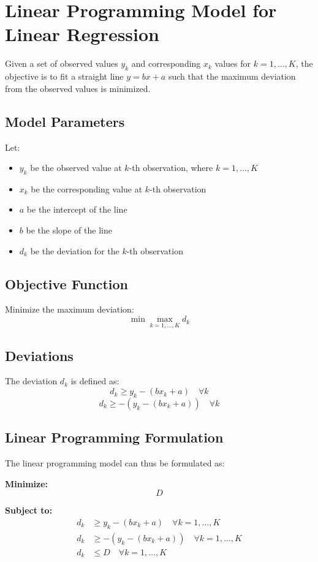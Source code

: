 \documentclass{article}
\begin{document}
\section*{Linear Programming Model for Linear Regression}

Given a set of observed values \(y_k\) and corresponding \(x_k\) values for \(k = 1, \ldots, K\), the objective is to fit a straight line \(y = bx + a\) such that the maximum deviation from the observed values is minimized.

\subsection*{Model Parameters}
Let:
\begin{itemize}
    \item \(y_k\) be the observed value at \(k\)-th observation, where \(k = 1, \ldots, K\)
    \item \(x_k\) be the corresponding value at \(k\)-th observation
    \item \(a\) be the intercept of the line
    \item \(b\) be the slope of the line
    \item \(d_k\) be the deviation for the \(k\)-th observation
\end{itemize}

\subsection*{Objective Function}
Minimize the maximum deviation:
\[
\min \max_{k=1, \ldots, K} d_k
\]

\subsection*{Deviations}
The deviation \(d_k\) is defined as:
\[
d_k \geq y_k - (bx_k + a) \quad \forall k
\]
\[
d_k \geq -(y_k - (bx_k + a)) \quad \forall k
\]

\subsection*{Linear Programming Formulation}
The linear programming model can thus be formulated as:

\textbf{Minimize:}
\[
D
\]

\textbf{Subject to:}
\begin{align*}
    d_k & \geq y_k - (bx_k + a) \quad \forall k = 1, \ldots, K \\
    d_k & \geq -(y_k - (bx_k + a)) \quad \forall k = 1, \ldots, K \\
    d_k & \leq D \quad \forall k = 1, \ldots, K
\end{align*}
\end{document}
